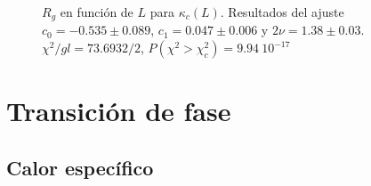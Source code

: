 \begin{figure}[h]
  \centering
  
  \caption{$R_g$ en función de $L$ para $\kappa_c(L)$. Resultados del ajuste
    $c_0=-0.535 \pm 0.089$, $c_1=0.047\pm 0.006$ y $2\nu=1.38\pm
    0.03$. $\chi^2/gl=73.6932/2$, $P(\chi^2>\chi_c^2)=9.94 \ 10^{-17}$}\label{Rg2_transicion}







\end{figure}

\clearpage

\section{Transición de fase}

\subsection{Calor específico}

